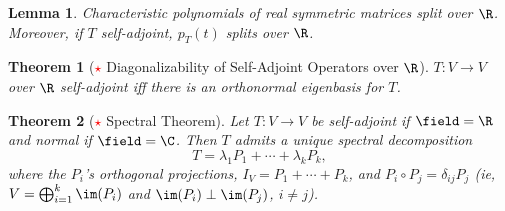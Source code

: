 \documentclass[12pt, oneside]{article}
\theoremstyle{definition}
\theoremstyle{plain}
\newtheorem{thm}{Theorem}
\newtheorem{lemma}{Lemma}
\theoremstyle{remark}
\begin{document}
\begin{lemma}
  Characteristic polynomials of real symmetric matrices split over $\R$. Moreover, if $T$ self-adjoint, $p_T(t)$ splits over $\R$.
\end{lemma}

\begin{thm}[\textcolor{red}{$\star$} Diagonalizability of Self-Adjoint Operators over $\R$]
  $T : V\to V$ over $\R$ self-adjoint iff there is an orthonormal eigenbasis for $T$.
\end{thm}

\begin{thm}[\textcolor{red}{$\star$} Spectral Theorem]
  Let $T : V\to V$ be self-adjoint if $\field = \R$ and normal if $\field = \C$. Then $T$ admits a unique spectral decomposition \[
    T = \lambda_1 P_1 + \cdots + \lambda_k P_k,
  \]
  where the $P_i$'s orthogonal projections, $I_V = P_1 + \cdots + P_k$, and $P_i \circ P_j = \delta_{ij} P_j$ (ie, $V = \bigoplus_{i=1}^k \im(P_i)$ and $\im(P_i) \perp \im(P_j)$, $i \neq j$).
\end{thm}
\end{document}
